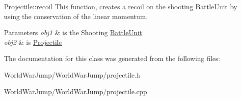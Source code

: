 \hyperlink{class_projectile_a0c2d868fd9e05d3055b8f625399d7909}{Projectile\+::recoil} This function, creates a recoil on the shooting \hyperlink{class_battle_unit}{Battle\+Unit} by using the conservation of the linear momentum. 


\begin{DoxyParams}{Parameters}
{\em obj1} & is the Shooting \hyperlink{class_battle_unit}{Battle\+Unit} \\
\hline
{\em obj2} & is \hyperlink{class_projectile}{Projectile} \\
\hline
\end{DoxyParams}


The documentation for this class was generated from the following files\+:\begin{DoxyCompactItemize}
\item 
World\+War\+Jump/\+World\+War\+Jump/projectile.\+h\item 
World\+War\+Jump/\+World\+War\+Jump/projectile.\+cpp\end{DoxyCompactItemize}
